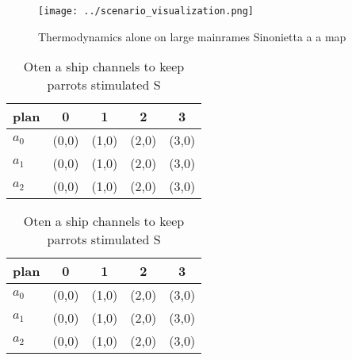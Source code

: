 \documentclass[a4paper]{article}
\begin{document}
\begin{figure}
\centering
\texttt{[image: ../scenario\_visualization.png]}
\caption{Thermodynamics alone on large mainrames Sinonietta a a map 
}
\end{figure}
 
\begin{table}
\begin{adjustbox}{width=0.6\columnwidth}
\begin{tabular}{|l|l|l|l|l|}
\hline
\textbf{plan} & \multicolumn{1}{c|}{\textbf{0}} & \multicolumn{1}{c|}{\textbf{1}} & \multicolumn{1}{c|}{\textbf{2}} & \multicolumn{1}{c|}{\textbf{3}} \\ \hline
\textbf{$a_0$}  & (0,0) & (1,0) & (2,0) & (3,0) \\ \hline
\textbf{$a_1$}  & (0,0) & (1,0) & (2,0) & (3,0) \\ \hline
\textbf{$a_2$}  & (0,0) & (1,0) & (2,0) & (3,0) \\ \hline
\end{tabular}
\end{adjustbox}
\caption{Oten a ship channels to keep parrots stimulated S
}
\end{table}

\begin{table}
\begin{adjustbox}{width=0.6\columnwidth}
\begin{tabular}{|l|l|l|l|l|}
\hline
\textbf{plan} & \multicolumn{1}{c|}{\textbf{0}} & \multicolumn{1}{c|}{\textbf{1}} & \multicolumn{1}{c|}{\textbf{2}} & \multicolumn{1}{c|}{\textbf{3}} \\ \hline
\textbf{$a_0$}  & (0,0) & (1,0) & (2,0) & (3,0) \\ \hline
\textbf{$a_1$}  & (0,0) & (1,0) & (2,0) & (3,0) \\ \hline
\textbf{$a_2$}  & (0,0) & (1,0) & (2,0) & (3,0) \\ \hline
\end{tabular}
\end{adjustbox}
\caption{Oten a ship channels to keep parrots stimulated S
}
\end{table}
\end{document}
